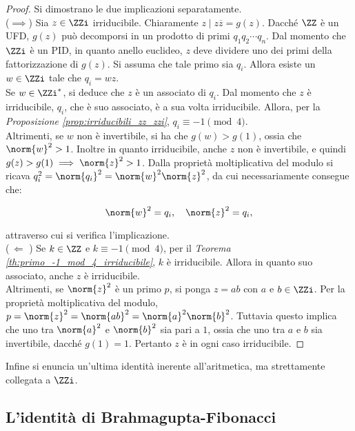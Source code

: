 \begin{proof} Si dimostrano le due implicazioni separatamente. \\

    ($\implies$)\; Sia $z \in \ZZi$ irriducibile. Chiaramente
    $z \mid z \overline{z} = g(z)$. Dacché $\ZZ$ è un UFD,
    $g(z)$ può decomporsi in un prodotto di primi $q_1q_2\cdots q_n$.
    Dal momento che $\ZZi$ è un PID, in quanto anello euclideo,
    $z$ deve dividere uno dei primi della fattorizzazione di
    $g(z)$. Si assuma che tale primo sia $q_i$. Allora esiste
    un $w \in \ZZi$ tale che $q_i=wz$. \\

    Se $w \in \ZZi^*$, si
    deduce che $z$ è un associato di $q_i$. Dal momento che
    $z$ è irriducibile, $q_i$, che è suo associato, è a sua
    volta irriducibile. Allora, per la \textit{Proposizione \ref{prop:irriducibili_zz_zzi}}, $q_i \equiv -1 \pmod4$.
    \\

    Altrimenti, se $w$ non è invertibile, si ha che $g(w)>g(1)$,
    ossia che $\norm{w}^2>1$. Inoltre in quanto irriducibile, anche
    $z$ non è invertibile, e quindi
    $g(z)>g(1) \implies \norm{z}^2>1$. Dalla proprietà
    moltiplicativa
    del modulo si ricava $q_i^2 = \norm{q_i}^2 = \norm{w}^2 \norm{z}^2$,
    da cui necessariamente consegue che:

    \[ \norm{w}^2=q_i, \quad \norm{z}^2=q_i, \]

    attraverso cui si verifica l'implicazione. \\

    ($\,\Longleftarrow\,\,$)\; Se $k \in \ZZ$ e $k \equiv -1 \pmod4$, per
    il \textit{Teorema \ref{th:primo_-1_mod_4_irriducibile}}, $k$ è
    irriducibile. Allora in quanto suo associato, anche $z$ è irriducibile. \\

    Altrimenti, se $\norm{z}^2$ è un primo $p$, si ponga
    $z=ab$ con $a$ e $b \in \ZZi$. Per la proprietà moltiplicativa
    del modulo, $p = \norm{z}^2 = \norm{ab}^2 = \norm{a}^2\norm{b}^2$.
    Tuttavia questo implica che uno tra $\norm{a}^2$ e $\norm{b}^2$
    sia pari a $1$, ossia che uno tra $a$ e $b$ sia invertibile,
    dacché $g(1)=1$. Pertanto $z$ è in ogni caso irriducibile.
\end{proof}

Infine si enuncia un'ultima identità inerente all'aritmetica, ma
strettamente collegata a $\ZZi$.

\subsection{L'identità di Brahmagupta-Fibonacci}

